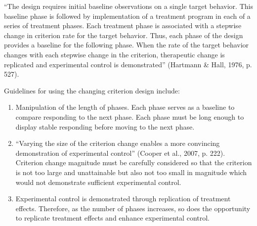 ``The design requires initial baseline observations on a single target behavior. This baseline phase is followed by implementation of a treatment program in each of a series of treatment phases. Each treatment phase is associated with a stepwise change in criterion rate for the target behavior. Thus, each phase of the design provides a baseline for the following phase. When the rate of the target behavior changes with each stepwise change in the criterion, therapeutic change is replicated and experimental control is demonstrated'' (Hartmann \& Hall, 1976, p. 527).

Guidelines for using the changing criterion design include:
\begin{enumerate}
\item Manipulation of the length of phases. Each phase serves as a baseline to compare responding to the next phase. Each phase must be long enough to display stable responding before moving to the next phase.
\item ``Varying the size of the criterion change enables a more convincing demonstration of experimental control'' (Cooper et al., 2007, p. 222). Criterion change magnitude must be carefully considered so that the criterion is not too large and unattainable but also not too small in magnitude which would not demonstrate sufficient experimental control.
\item Experimental control is demonstrated through replication of treatment effects. Therefore, as the number of phases increases, so does the opportunity to replicate treatment effects and enhance experimental control.
\end{enumerate}
%
